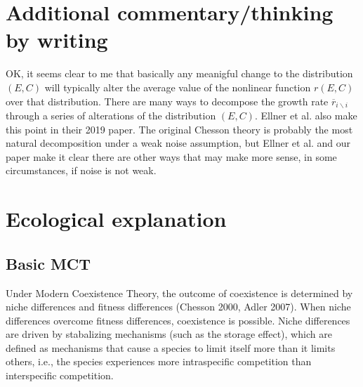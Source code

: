 \documentclass[letterpaper,11pt]{article}
\newcommand{\olr}{\overline{r}}
\newcommand{\bs}{\backslash}
\begin{document}
\section{Additional commentary/thinking by writing}

OK, it seems clear to me that basically any meanigful change to the distribution 
$(E,C)$ will typically alter the average value of the nonlinear function $r(E,C)$ 
over that distribution. There are many ways to decompose the growth rate 
$\olr_{i \bs i}$ through a series of alterations of the distribution $(E,C)$. 
Ellner et al. also make this point in their 2019 paper. The original Chesson 
theory is probably the most natural decomposition under a weak noise assumption,
but Ellner et al. and our paper make it clear there are other ways that may make
more sense, in some circumstances, if noise is not weak. 

\section{Ecological explanation}
\subsection{Basic MCT}
Under Modern Coexistence Theory, the outcome of coexistence is determined by 
niche differences and fitness differences (Chesson 2000, Adler 2007). 
When niche differences overcome fitness differences, coexistence is possible. 
Niche differences are driven by stabalizing mechanisms (such as the storage effect), 
which are defined as mechanisms that cause a species to limit itself more than it 
limits others, i.e., the species experiences more intraspecific competition than 
interspecific competition. 
\end{document}
